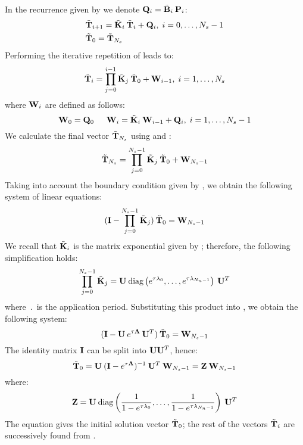  \label{sec:ce-solution}
In the recurrence given by  we denote $\mathbf{Q}_i = \tilde{\mathbf{B}}_i \: \mathbf{P}_i$:
\begin{align}
  & \tilde{\mathbf{T}}_{i + 1} = \tilde{\mathbf{K}}_i \: \tilde{\mathbf{T}}_i + \mathbf{Q}_i, \; i = 0, \dots, N_s - 1 \label{eq:ce-recurrent} \\
  & \tilde{\mathbf{T}}_0 = \tilde{\mathbf{T}}_{N_s} \nonumber
\end{align}
Performing the iterative repetition of  leads to:
\begin{equation} \label{eq:y-recurrent}
  \tilde{\mathbf{T}}_i = \prod_{j = 0}^{i - 1} \tilde{\mathbf{K}}_j \: \tilde{\mathbf{T}}_0 + \mathbf{W}_{i - 1}, \; i = 1, \dots, N_s
\end{equation}
where $\mathbf{W}_i$ are defined as follows:
\begin{equation}
  \mathbf{W}_0 = \mathbf{Q}_0 \hspace{15pt} \mathbf{W}_i = \tilde{\mathbf{K}}_i \: \mathbf{W}_{i - 1} + \mathbf{Q}_i, \; i = 1, \dots, N_s - 1 \label{eq:p-recurrent}
\end{equation}
We calculate the final vector $\tilde{\mathbf{T}}_{N_s}$ using  and :
\[
  \tilde{\mathbf{T}}_{N_s} = \prod_{j = 0}^{N_s - 1} \tilde{\mathbf{K}}_j \: \tilde{\mathbf{T}}_0 + \mathbf{W}_{N_s - 1}
\]
Taking into account the boundary condition given by , we obtain the following system of linear equations:
\begin{equation} \label{eq:core-system}
  (\mathbf{I} - \prod_{j = 0}^{N_s - 1} \tilde{\mathbf{K}}_j) \: \tilde{\mathbf{T}}_0 = \mathbf{W}_{N_s - 1}
\end{equation}
We recall that $\tilde{\mathbf{K}}_i$ is the matrix exponential given by ; therefore, the following simplification holds:
\[
  \prod_{j = 0}^{N_s - 1} \tilde{\mathbf{K}}_j = \mathbf{U} \: \text{diag} \left( e^{\tau \lambda_0}, \dots, e^{\tau \lambda_{N_n - 1}} \right) \: \mathbf{U}^T
\]
where $\period$ is the application period. Substituting this product into , we obtain the following system:
\[
  (\mathbf{I} - \mathbf{U} \: e^{\tau \mathbf{\Lambda}} \: \mathbf{U}^T) \: \tilde{\mathbf{T}}_0 = \mathbf{W}_{N_s - 1}
\]
The identity matrix $\mathbf{I}$ can be split into $\mathbf{U} \mathbf{U}^T$, hence:
\begin{equation} \label{eq:t0}
  \tilde{\mathbf{T}}_0 = \mathbf{U} \: (\mathbf{I} - e^{\tau \mathbf{\Lambda}})^{-1} \: \mathbf{U}^T \: \mathbf{W}_{N_s - 1} = \mathbf{Z} \: \mathbf{W}_{N_s - 1}
\end{equation}
where:
\[
  \mathbf{Z} = \mathbf{U} \: \text{diag} \left( \frac{1}{1 - e^{\tau \lambda_0}}, \dots, \frac{1}{1 - e^{\tau \lambda_{N_n - 1}}} \right) \: \mathbf{U}^T
\]
The equation gives the initial solution vector $\tilde{\mathbf{T}}_0$; the rest of the vectors $\tilde{\mathbf{T}}_i$ are successively found from .

